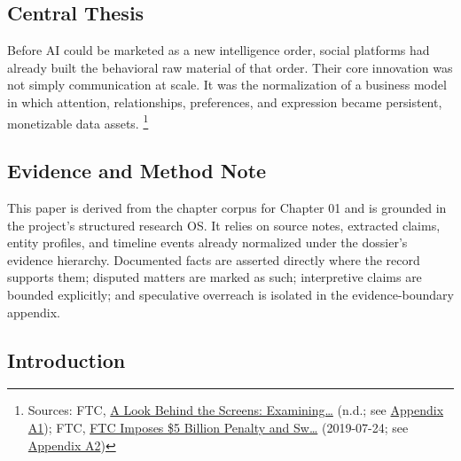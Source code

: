 \documentclass[
  american,
  11pt,
  letterpaper,
]{article}
\begin{document}
\subsection{Central Thesis}\label{central-thesis-1}

Before AI could be marketed as a new intelligence order, social
platforms had already built the behavioral raw material of that order.
Their core innovation was not simply communication at scale. It was the
normalization of a business model in which attention, relationships,
preferences, and expression became persistent, monetizable data assets.
\footnote{Sources: FTC,
  \href{https://www.ftc.gov/reports/look-behind-screens-examining-data-practices-social-media-video-streaming-services}{A
  Look Behind the Screens: Examining\ldots{}} (n.d.; see
  \hyperref[ch-01-appendix-a1-a-look-behind-the-screens-examining-the-data-practices-of-social-media-and-video-streaming-services]{Appendix
  A1}); FTC,
  \href{https://www.ftc.gov/news-events/news/press-releases/2019/07/ftc-imposes-5-billion-penalty-sweeping-new-privacy-restrictions-facebook}{FTC
  Imposes \$5 Billion Penalty and Sw\ldots{}} (2019-07-24; see
  \hyperref[ch-01-appendix-a2-ftc-imposes-5-billion-penalty-and-sweeping-new-privacy-restrictions-on-facebook]{Appendix
  A2})}

\subsection{Evidence and Method Note}\label{evidence-and-method-note-1}

This paper is derived from the chapter corpus for Chapter 01 and is
grounded in the project's structured research OS. It relies on source
notes, extracted claims, entity profiles, and timeline events already
normalized under the dossier's evidence hierarchy. Documented facts are
asserted directly where the record supports them; disputed matters are
marked as such; interpretive claims are bounded explicitly; and
speculative overreach is isolated in the evidence-boundary appendix.

\subsection{Introduction}\label{introduction-1}
\end{document}
